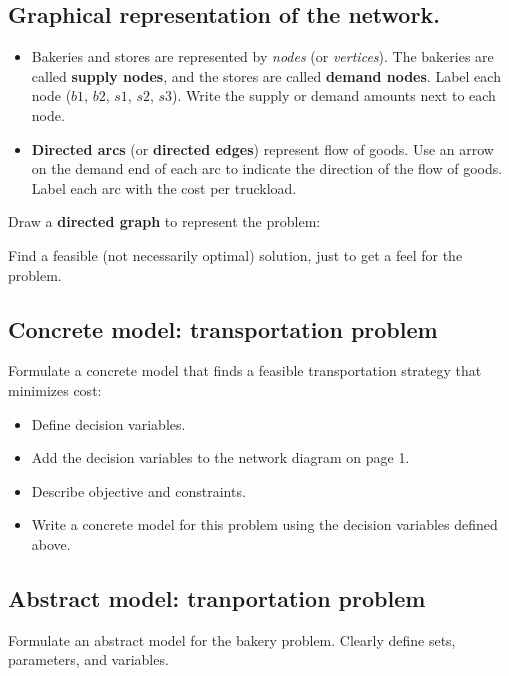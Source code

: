 \documentclass[11pt]{article}
\theoremstyle{definition}
\begin{document}
\subsection{Graphical representation of the network.}
\begin{itemize}
\item Bakeries and stores are represented by \emph{nodes} (or \emph{vertices}).  The bakeries are called \textbf{supply nodes}, and the stores are called \textbf{demand nodes}.  Label each node ($b1$, $b2$, $s1$, $s2$, $s3$).    Write the supply or demand amounts next to each node. 
\item \textbf{Directed arcs} (or \textbf{directed edges}) represent flow of goods.  Use an arrow on the demand end of each arc to indicate the direction of the flow of goods.  Label each arc with the cost per truckload.  
\end{itemize}

Draw a \textbf{directed graph} to represent the problem:

\newpage
Find a feasible (not necessarily optimal) solution, just to get a feel for the problem.  \vspace{1 in}


\subsection{Concrete model: transportation problem}
Formulate a concrete model that finds a feasible transportation strategy that minimizes cost:
\begin{itemize}

\item  Define decision variables.  
\vspace{1 in}

\item  Add the decision variables to the network diagram on page 1.

\item Describe objective and constraints.
\vspace{1.5in}
\item Write a concrete model for this problem using the decision variables defined above. 
\end{itemize}

\newpage
\subsection{Abstract model: tranportation problem}
Formulate an abstract model for the bakery problem. Clearly define sets, parameters, and variables.
\end{document}
